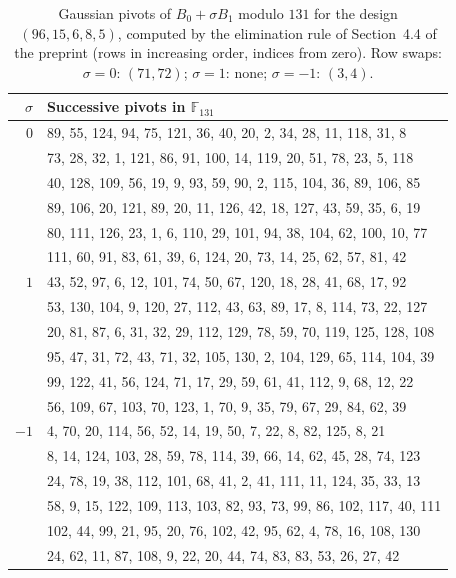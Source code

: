 \documentclass[11pt]{article}
\theoremstyle{definition}
\begin{document}
\begin{table}[ht]
\centering
\small
\begin{tabular}{rl}
\hline
$\sigma$ & Successive pivots in $\mathbb{F}_{131}$ \\
\hline
$0$ & 89, 55, 124, 94, 75, 121, 36, 40, 20, 2, 34, 28, 11, 118, 31, 8 \\
 & 73, 28, 32, 1, 121, 86, 91, 100, 14, 119, 20, 51, 78, 23, 5, 118 \\
 & 40, 128, 109, 56, 19, 9, 93, 59, 90, 2, 115, 104, 36, 89, 106, 85 \\
 & 89, 106, 20, 121, 89, 20, 11, 126, 42, 18, 127, 43, 59, 35, 6, 19 \\
 & 80, 111, 126, 23, 1, 6, 110, 29, 101, 94, 38, 104, 62, 100, 10, 77 \\
 & 111, 60, 91, 83, 61, 39, 6, 124, 20, 73, 14, 25, 62, 57, 81, 42 \\
\hline
$1$ & 43, 52, 97, 6, 12, 101, 74, 50, 67, 120, 18, 28, 41, 68, 17, 92 \\
 & 53, 130, 104, 9, 120, 27, 112, 43, 63, 89, 17, 8, 114, 73, 22, 127 \\
 & 20, 81, 87, 6, 31, 32, 29, 112, 129, 78, 59, 70, 119, 125, 128, 108 \\
 & 95, 47, 31, 72, 43, 71, 32, 105, 130, 2, 104, 129, 65, 114, 104, 39 \\
 & 99, 122, 41, 56, 124, 71, 17, 29, 59, 61, 41, 112, 9, 68, 12, 22 \\
 & 56, 109, 67, 103, 70, 123, 1, 70, 9, 35, 79, 67, 29, 84, 62, 39 \\
\hline
$-1$ & 4, 70, 20, 114, 56, 52, 14, 19, 50, 7, 22, 8, 82, 125, 8, 21 \\
 & 8, 14, 124, 103, 28, 59, 78, 114, 39, 66, 14, 62, 45, 28, 74, 123 \\
 & 24, 78, 19, 38, 112, 101, 68, 41, 2, 41, 111, 11, 124, 35, 33, 13 \\
 & 58, 9, 15, 122, 109, 113, 103, 82, 93, 73, 99, 86, 102, 117, 40, 111 \\
 & 102, 44, 99, 21, 95, 20, 76, 102, 42, 95, 62, 4, 78, 16, 108, 130 \\
 & 24, 62, 11, 87, 108, 9, 22, 20, 44, 74, 83, 83, 53, 26, 27, 42 \\
\hline
\end{tabular}
\caption{Gaussian pivots of $B_0+\sigma B_1$ modulo $131$ for the design $(96,15,6,8,5)$, computed by the elimination rule of Section~4.4 of the preprint (rows in increasing order, indices from zero). Row swaps: $\sigma=0$: $(71,72)$; $\sigma=1$: none; $\sigma=-1$: $(3,4)$.}
\label{tab:pivots131}
\end{table}
\end{document}
